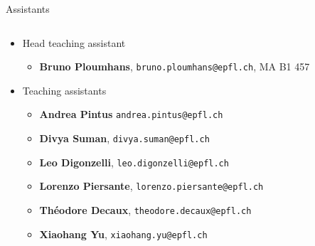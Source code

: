 \begin{frame}{Assistants}
    \begin{columns}
    \begin{column}{1.1\textwidth}
    \begin{itemize}
        \item Head teaching assistant
            \begin{itemize}
                \item \textbf{Bruno Ploumhans}, \texttt{bruno.ploumhans@epfl.ch}, MA B1 457
            \end{itemize}
            \vspace{1.5em}
        \item Teaching assistants
            \begin{itemize}
                    \vspace{0.1em}
                    \item \textbf{Andrea Pintus} \texttt{andrea.pintus@epfl.ch}
                    \vspace{0.1em}
                    \item \textbf{Divya Suman}, \texttt{divya.suman@epfl.ch}
                    \vspace{0.1em}
                    \item \textbf{Leo Digonzelli}, \texttt{leo.digonzelli@epfl.ch}
                    \vspace{0.1em}
                    \item \textbf{Lorenzo Piersante}, \texttt{lorenzo.piersante@epfl.ch}
                    \vspace{0.1em}
                    \item \textbf{Théodore Decaux}, \texttt{theodore.decaux@epfl.ch}
                    \vspace{0.1em}
                    \item \textbf{Xiaohang Yu}, \texttt{xiaohang.yu@epfl.ch}
            \end{itemize}
    \end{itemize}
    \end{column}
    \end{columns}
\end{frame}

